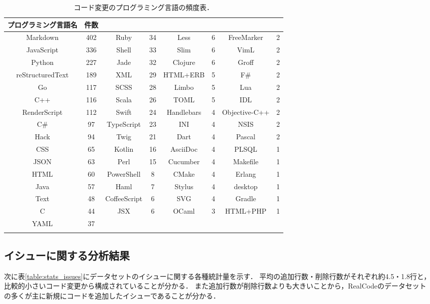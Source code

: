 \begin{table}[!b]
    \small
    \centering
    \caption{コード変更のプログラミング言語の頻度表．} 
    \label{table:issue_lang_freq}
    \begin{tabular}{c | c || c | c || c | c || c | c} \Xhline{3\arrayrulewidth}
        プログラミング言語名 & 件数 &  &  &  &  &  &   \\ \hline \hline
        Markdown & 402 & Ruby & 34 & Less & 6 & FreeMarker & 2 \\
        JavaScript & 336 & Shell & 33 & Slim & 6 & VimL & 2 \\
        Python & 227 & Jade & 32 & Clojure & 6 & Groff & 2 \\
        reStructuredText & 189 & XML & 29 & HTML+ERB & 5 & F\# & 2 \\
        Go & 117 & SCSS & 28 & Limbo & 5 & Lua & 2 \\
        C++ & 116 & Scala & 26 & TOML & 5 & IDL & 2 \\
        RenderScript & 112 & Swift & 24 & Handlebars & 4 & Objective-C++ & 2 \\
        C\# & 97 & TypeScript & 23 & INI & 4 & NSIS & 2 \\
        Hack & 94 & Twig & 21 & Dart & 4 & Pascal & 2 \\
        CSS & 65 & Kotlin & 16 & AsciiDoc & 4 & PLSQL & 1 \\
        JSON & 63 & Perl & 15 & Cucumber & 4 & Makefile & 1 \\
        HTML & 60 & PowerShell & 8 & CMake & 4 & Erlang & 1 \\
        Java & 57 & Haml & 7 & Stylus & 4 & desktop & 1 \\
        Text & 48 & CoffeeScript & 6 & SVG & 4 & Gradle & 1 \\
        C & 44 & JSX & 6 & OCaml & 3 & HTML+PHP & 1 \\
        YAML & 37 & & & & & & \\
        \Xhline{3\arrayrulewidth}
    \end{tabular}
\end{table}

\subsection{イシューに関する分析結果}

次に表\ref{table:stats_issues}にデータセットのイシューに関する各種統計量を示す．
平均の追加行数・削除行数がそれぞれ約4.5・1.8行と，比較的小さいコード変更から構成されていることが分かる．
また追加行数が削除行数よりも大きいことから，RealCodeのデータセットの多くが主に新規にコードを追加したイシューであることが分かる．

